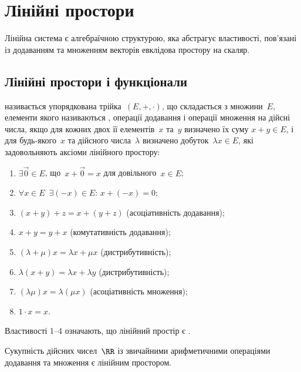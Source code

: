 \chapter{Лінійні простори}

Лінійна система є алгебраїчною структурою, яка абстрагує
властивості, пов’язані із додаванням та множенням векторів
евклідова простору на скаляр.

\section{Лінійні простори і функціонали}

\begin{definition}
називається упорядкована трійка~$(E, +, \cdot)$, що складається з
множини~$E$, елементи якого називаються ,
операції додавання і операції множення на дійсні числа, якщо
для кожних двох її елементів~$x$ та~$y$ визначено їх суму
$x + y \in E$, і для будь-якого~$x$ та дійсного числа~$\lambda$ визначено
добуток~$\lambda x \in E$, які задовольняють аксіоми лінійного
простору:
\begin{enumerate}
\item $\exists \vec 0 \in E$, що~$x + \vec 0 = x$ для довільного~$x \in E$;
\item $\forall x \in E$~$\exists (-x) \in E$: $x + (-x) = 0$;
\item $(x + y) + z = x + (y + z)$ (асоціативність додавання);
\item $x + y = y + x$ (комутативність додавання);
\item $(\lambda + \mu) x = \lambda x + \mu x$ (дистрибутивність);
\item $\lambda (x + y) = \lambda x + \lambda y$ (дистрибутивність);
\item $(\lambda \mu) x = \lambda (\mu x)$ (асоціативність множення);
\item $1 \cdot x = x$.
\end{enumerate}
\end{definition}

\begin{remark}
Властивості 1--4 означають, що лінійний простір є
.
\end{remark}

\begin{example}
Сукупність дійсних чисел~$\RR$ із звичайними
арифметичними операціями додавання та множення є
лінійним простором.
\end{example}

